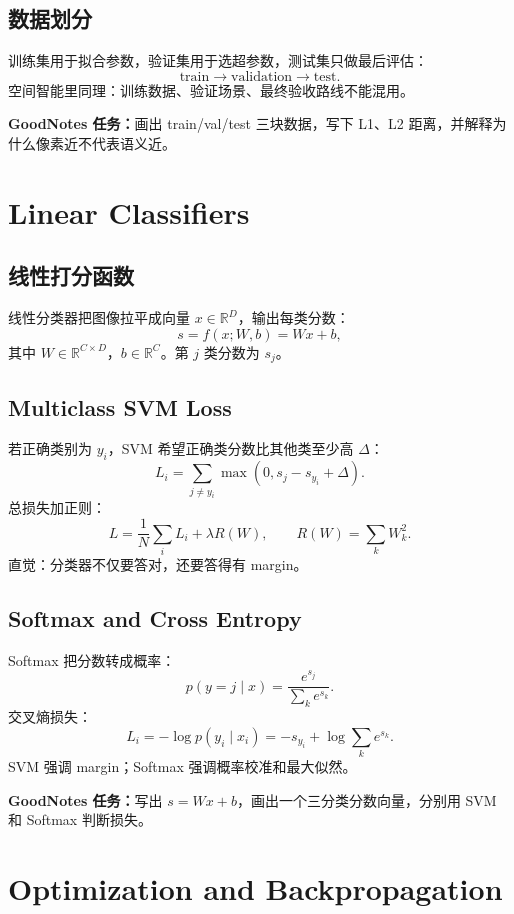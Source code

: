 \documentclass[11pt]{article}
\newcommand{\R}{\mathbb{R}}
\newcommand{\goodnotes}[1]{\textbf{GoodNotes 任务：}#1}
\begin{document}
\subsection{数据划分}

训练集用于拟合参数，验证集用于选超参数，测试集只做最后评估：
\[
  \text{train}\rightarrow \text{validation}\rightarrow \text{test}.
\]
空间智能里同理：训练数据、验证场景、最终验收路线不能混用。

\goodnotes{画出 train/val/test 三块数据，写下 L1、L2 距离，并解释为什么像素近不代表语义近。}

\section{Linear Classifiers}

\subsection{线性打分函数}

线性分类器把图像拉平成向量 $x\in\R^D$，输出每类分数：
\[
  s=f(x;W,b)=Wx+b,
\]
其中 $W\in\R^{C\times D}$，$b\in\R^C$。第 $j$ 类分数为 $s_j$。

\subsection{Multiclass SVM Loss}

若正确类别为 $y_i$，SVM 希望正确类分数比其他类至少高 $\Delta$：
\[
  L_i=
  \sum_{j\neq y_i}
  \max(0,s_j-s_{y_i}+\Delta).
\]
总损失加正则：
\[
  L=\frac{1}{N}\sum_i L_i+\lambda R(W),
\qquad
  R(W)=\sum_k W_k^2.
\]
直觉：分类器不仅要答对，还要答得有 margin。

\subsection{Softmax and Cross Entropy}

Softmax 把分数转成概率：
\[
  p(y=j\mid x)=\frac{e^{s_j}}{\sum_k e^{s_k}}.
\]
交叉熵损失：
\[
  L_i=-\log p(y_i\mid x_i)
  =
  -s_{y_i}+\log\sum_k e^{s_k}.
\]
SVM 强调 margin；Softmax 强调概率校准和最大似然。

\goodnotes{写出 $s=Wx+b$，画出一个三分类分数向量，分别用 SVM 和 Softmax 判断损失。}

\section{Optimization and Backpropagation}
\end{document}
